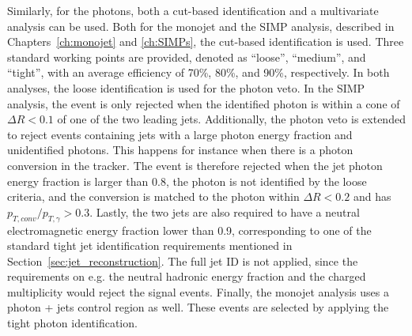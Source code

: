 Similarly, for the photons, both a cut-based identification and a multivariate analysis can be used. Both for the monojet and the \ac{SIMP} analysis, described in Chapters~\ref{ch:monojet} and \ref{ch:SIMPs}, the cut-based identification is used. Three standard working points are provided, denoted as ``loose'', ``medium'', and ``tight'', with an average efficiency of 70\%, 80\%, and 90\%, respectively. In both analyses, the loose identification is used for the photon veto. In the \ac{SIMP} analysis, the event is only rejected when the identified photon is within a cone of $\Delta R < 0.1$ of one of the two leading jets. Additionally, the photon veto is extended to reject events containing jets with a large photon energy fraction and unidentified photons. This happens for instance when there is a photon conversion in the tracker. The event is therefore rejected when the jet photon energy fraction is larger than 0.8, the photon is not identified by the loose criteria, and the conversion is matched to the photon within $\Delta R < 0.2$ and has $p_{T,conv} / p_{T,\gamma} > 0.3$. Lastly, the two jets are also required to have a neutral electromagnetic energy fraction lower than 0.9, corresponding to one of the standard tight jet identification requirements mentioned in Section~\ref{sec:jet_reconstruction}. The full jet ID is not applied, since the requirements on e.g. the neutral hadronic energy fraction and the charged multiplicity would reject the signal events. Finally, the monojet analysis uses a photon + jets control region as well. These events are selected by applying the tight photon identification.


